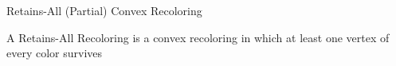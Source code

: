 \begin{frame}{Retains-All (Partial) Convex Recoloring}

\begin{definition}
A \alert{Retains-All Recoloring} 
is a convex recoloring in which at least one vertex of every color survives 
\end{definition}
\begin{columns}[T]
\begin{column}{.33\linewidth}
\onslide<2->{

}
\end{column}
\begin{column}{.33\linewidth}
\end{column}
\begin{column}{.33\linewidth}
\end{column}
\end{columns}
\end{frame}
